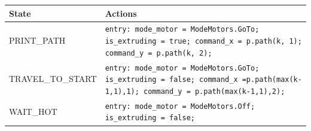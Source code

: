 \begin{tabular}{@{}lp{}@{}}
\toprule
State & Actions \\
\midrule
PRINT\_PATH & \texttt{entry: mode\_motor = ModeMotors.GoTo; is\_extruding = true; command\_x = p.path(k, 1); command\_y = p.path(k, 2);} \\
TRAVEL\_TO\_START & \texttt{entry: mode\_motor = ModeMotors.GoTo; is\_extruding = false; command\_x =p.path(max(k-1,1),1); command\_y = p.path(max(k-1,1),2);} \\
WAIT\_HOT & \texttt{entry: mode\_motor = ModeMotors.Off; is\_extruding = false;} \\
\bottomrule
\end{tabular}
